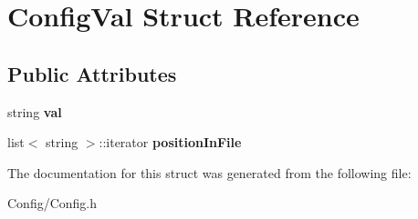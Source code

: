 \hypertarget{struct_config_val}{
\section{\-Config\-Val \-Struct \-Reference}
\label{struct_config_val}
}
\subsection*{\-Public \-Attributes}
\begin{DoxyCompactItemize}
\item 
\hypertarget{struct_config_val_a7ace719baff94cd3c4d8f41804949ae3}{
string {\bfseries val}}
\label{struct_config_val_a7ace719baff94cd3c4d8f41804949ae3}

\item 
\hypertarget{struct_config_val_a28edcf3f0dc74dda4daa8bb20f2d4400}{
list$<$ string $>$\-::iterator {\bfseries position\-In\-File}}
\label{struct_config_val_a28edcf3f0dc74dda4daa8bb20f2d4400}

\end{DoxyCompactItemize}


\-The documentation for this struct was generated from the following file\-:\begin{DoxyCompactItemize}
\item 
\-Config/\-Config.\-h\end{DoxyCompactItemize}
